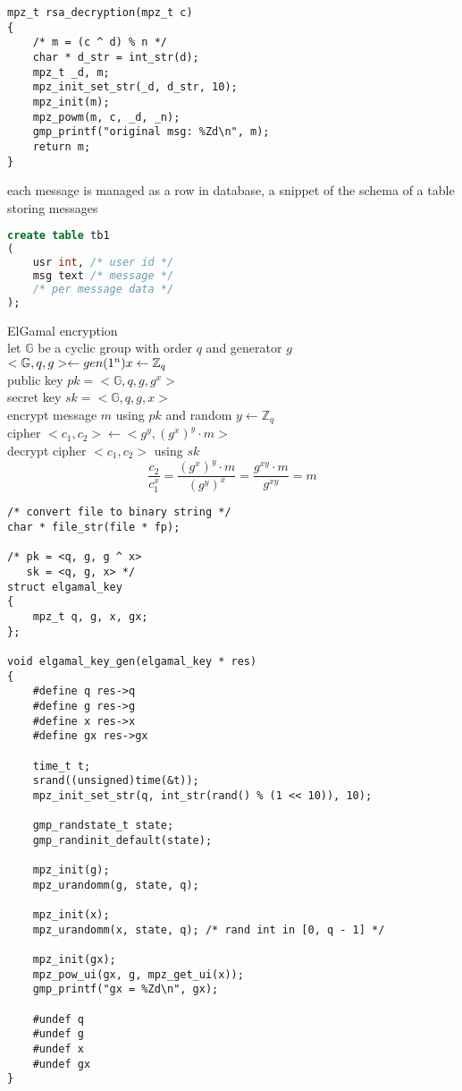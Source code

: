 \documentclass[12pt, border = 4pt, multi]{article} %
\begin{document}
\begin{multicols}{2}
\begin{lstlisting}[morekeywords = {mpz_t}]
mpz_t rsa_decryption(mpz_t c)
{
	/* m = (c ^ d) % n */
	char * d_str = int_str(d);
	mpz_t _d, m;
	mpz_init_set_str(_d, d_str, 10);
	mpz_init(m);
	mpz_powm(m, c, _d, _n);
	gmp_printf("original msg: %Zd\n", m);
	return m;
}
\end{lstlisting}
each message is managed as a row in database, a snippet of the schema of a table storing messages
\begin{lstlisting}[language = sql]
create table tb1
(
	usr int, /* user id */
	msg text /* message */
	/* per message data */
);
\end{lstlisting}
ElGamal encryption\\
let $\mathbb{G}$ be a cyclic group with order $q$ and generator $g$\\
$<\mathbb{G}, q, g> \leftarrow gen(1 ^ n)\\
x \leftarrow \mathbb{Z}_q$\\
public key $pk = <\mathbb{G}, q, g, g^x>$\\
secret key $sk = <\mathbb{G}, q, g, x>$\\
encrypt message $m$ using $pk$ and random $y \leftarrow \mathbb{Z}_q$\\
cipher $<c_1, c_2> \leftarrow <g ^ y, (g ^ x) ^ y \cdot m >$\\
decrypt cipher $<c_1, c_2>$ using $sk$\\
\[\frac{c_2}{c_1 ^ x} = \frac{(g ^ x) ^ y \cdot m}{(g ^ y) ^ x} = \frac{g ^ {xy} \cdot m}{g ^ {xy}} = m\]
\begin{lstlisting}[morekeywords = {mpz_t, time_t, define, undef}]
/* convert file to binary string */
char * file_str(file * fp); 

/* pk = <q, g, g ^ x> 
   sk = <q, g, x> */
struct elgamal_key
{
	mpz_t q, g, x, gx;
};

void elgamal_key_gen(elgamal_key * res)
{
	#define q res->q
	#define g res->g
	#define x res->x
	#define gx res->gx

	time_t t;
	srand((unsigned)time(&t)); 
	mpz_init_set_str(q, int_str(rand() % (1 << 10)), 10);

	gmp_randstate_t state;
	gmp_randinit_default(state);

	mpz_init(g);
	mpz_urandomm(g, state, q);

	mpz_init(x);
	mpz_urandomm(x, state, q); /* rand int in [0, q - 1] */

	mpz_init(gx);
	mpz_pow_ui(gx, g, mpz_get_ui(x));
	gmp_printf("gx = %Zd\n", gx);

	#undef q
	#undef g
	#undef x
	#undef gx
}


\end{lstlisting}
\end{multicols}
\end{document}
